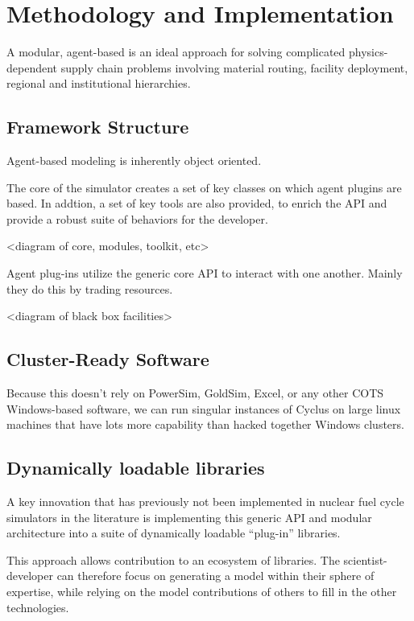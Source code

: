 \section{Methodology and Implementation}

A modular, agent-based is an ideal approach for solving complicated
physics-dependent supply chain problems involving material routing, facility
deployment, regional and institutional hierarchies.

\subsection{Framework Structure}

Agent-based modeling is inherently object oriented. 

The core of the simulator creates a set of key classes on which agent plugins 
are based. In addtion, a set of key tools are also provided, to enrich the API 
and provide a robust suite of behaviors for the developer.

<diagram of core, modules, toolkit, etc>

Agent plug-ins utilize the generic core API to interact with one another. 
Mainly they do this by trading resources. 

<diagram of black box facilities>

\subsection{Cluster-Ready Software}

Because this doesn't rely on PowerSim, GoldSim, Excel, or any other COTS 
Windows-based software, we can run singular instances of Cyclus 
on large linux machines that have lots more capability than hacked together 
Windows clusters. 

\subsection{Dynamically loadable libraries}

A key innovation that has previously not been implemented in nuclear fuel cycle 
simulators in the literature is implementing this generic API and modular 
architecture into a suite of dynamically loadable ``plug-in'' libraries. 

This approach allows contribution to an ecosystem of libraries. The 
scientist-developer can therefore focus on generating a model within their 
sphere of expertise, while relying on the model contributions of others to fill 
in the other technologies.

